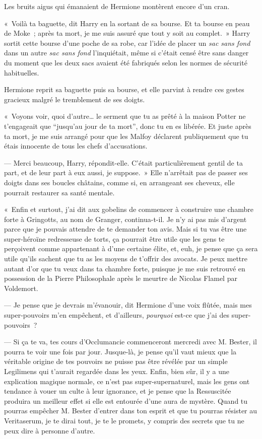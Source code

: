 Les bruits aigus qui émanaient de Hermione montèrent encore d'un cran.

«~Voilà ta baguette, dit Harry en la sortant de sa bourse. Et ta bourse en peau de Moke~; après ta mort, je me suis assuré que tout y soit au complet.~» Harry sortit cette bourse d'une poche de sa robe, car l'idée de placer un \emph{sac sans fond} dans un autre \emph{sac sans fond} l'inquiétait, même si c'était censé être sans danger du moment que les deux sacs avaient été fabriqués selon les normes de sécurité habituelles.

Hermione reprit sa baguette puis sa bourse, et elle parvint à rendre ces gestes gracieux malgré le tremblement de ses doigts.

«~Voyons voir, quoi d'autre… le serment que tu as prêté à la maison Potter ne t'engageait que “jusqu'au jour de ta mort”, donc tu en es libérée. Et juste après ta mort, je me suis arrangé pour que les Malfoy déclarent publiquement que tu étais innocente de tous les chefs d'accusations.

--- Merci beaucoup, Harry, répondit-elle. C'était particulièrement gentil de ta part, et de leur part à eux aussi, je suppose.~» Elle n'arrêtait pas de passer ses doigts dans ses boucles châtains, comme si, en arrangeant ses cheveux, elle pourrait restaurer sa santé mentale.

«~Enfin et surtout, j'ai dit aux gobelins de commencer à construire une chambre forte à Gringotts, au nom de Granger, continua-t-il. Je n'y ai pas mis d'argent parce que je pouvais attendre de te demander ton avis. Mais si tu vas être une super-héroïne redresseuse de torts, ça pourrait être utile que les gens te perçoivent comme appartenant à d'une certaine élite, et, euh, je pense que ça sera utile qu'ils sachent que tu as les moyens de t'offrir des avocats. Je peux mettre autant d'or que tu veux dans ta chambre forte, puisque je me suis retrouvé en possession de la Pierre Philosophale après le meurtre de Nicolas Flamel par Voldemort.

--- Je pense que je devrais m'évanouir, dit Hermione d'une voix flûtée, mais mes super-pouvoirs m'en empêchent, et d'ailleurs, \emph{pourquoi} est-ce que j'ai des super-pouvoirs~?

--- Si ça te va, tes cours d'Occlumancie commenceront mercredi avec M. Bester, il pourra te voir une fois par jour. Jusque-là, je pense qu'il vaut mieux que la véritable origine de tes pouvoirs ne puisse pas être révélée par un simple Legilimens qui t'aurait regardée dans les yeux. Enfin, bien sûr, il y a une explication magique normale, ce n'est pas super-supernaturel, mais les gens ont tendance à vouer un culte à leur ignorance, et je pense que la Ressuscitée produira un meilleur effet si elle est entourée d'une aura de mystère. Quand tu pourras empêcher M. Bester d'entrer dans ton esprit et que tu pourras résister au Veritaserum, je te dirai tout, je te le promets, y compris des secrets que tu ne peux dire à personne d'autre.

